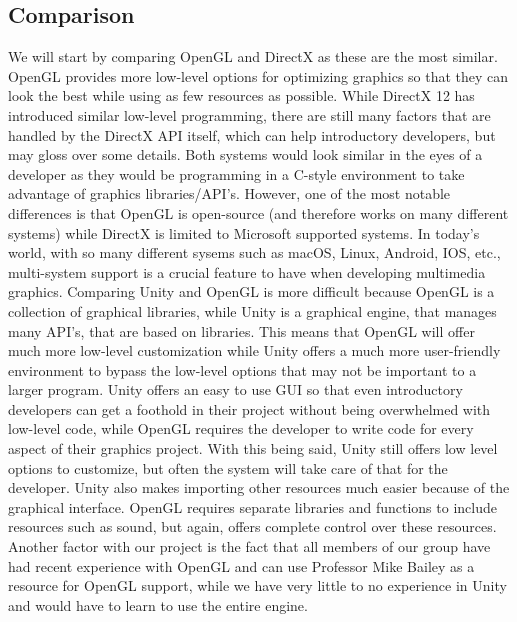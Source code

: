 \documentclass[onecolumn, draftclsnofoot,10pt, compsoc]{IEEEtran}
\begin{document}
\subsection{Comparison}
We will start by comparing OpenGL and DirectX as these are the most similar. OpenGL provides more low-level options for optimizing graphics so that they can look the best while using as few resources as possible. While DirectX 12 has introduced similar low-level programming, there are still many factors that are handled by the DirectX API itself, which can help introductory developers, but may gloss over some details. Both systems would look similar in the eyes of a developer as they would be programming in a C-style environment to take advantage of graphics libraries/API's. However, one of the most notable differences is that OpenGL is open-source (and therefore works on many different systems) while DirectX is limited to Microsoft supported systems. In today's world, with so many different sysems such as macOS, Linux, Android, IOS, etc., multi-system support is a crucial feature to have when developing multimedia graphics. 
\newline
\newline
Comparing Unity and OpenGL is more difficult because OpenGL is a collection of graphical libraries, while Unity is a graphical engine, that manages many API's, that are based on libraries. This means that OpenGL will offer much more low-level customization while Unity offers a much more user-friendly environment to bypass the low-level options that may not be important to a larger program. Unity offers an easy to use GUI so that even introductory developers can get a foothold in their project without being overwhelmed with low-level code, while OpenGL requires the developer to write code for every aspect of their graphics project. With this being said, Unity still offers low level options to customize, but often the system will take care of that for the developer. Unity also makes importing other resources much easier because of the graphical interface. OpenGL requires separate libraries and functions to include resources such as sound, but again, offers complete control over these resources. Another factor with our project is the fact that all members of our group have had recent experience with OpenGL and can use Professor Mike Bailey as a resource for OpenGL support, while we have very little to no experience in Unity and would have to learn to use the entire engine. 
\end{document}
